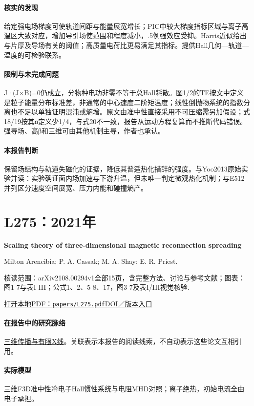 \documentclass[UTF8,a4paper,11pt,openany,fontset=fandol]{ctexbook}
\begin{document}
\paragraph{核实的发现}给定强电场梯度可使轨道间距与能量展宽增长；PIC中较大梯度指标区域与离子高温区大致对应，增加导引场使范围和程度减小，.5例强效应受抑。Harris近似给出与片厚及导场有关的阈值；高质量电荷比更易满足其指标。提供Hall几何—轨道—温度的可检验联系。

\paragraph{限制与未完成问题}J·(J×B)=0仍成立，分物种电功非零不等于总Hall耗散。图1/2的TE按文中定义是粒子能量分布标准差，非通常的中心速度二阶矩温度；线性倒抛物系统的指数分离也不足以单独证明混沌或熵增。原文由准中性直接采用不可压缩需另加假设；式18/19按其α定义少1/4，与式20不一致，报告从运动方程复算而不推断代码错误。强导场、高β和三维可由其他机制主导，作者也承认。

\paragraph{本报告判断}保留场结构与轨道失磁化的证据，降低其普适热化措辞的强度。与Yoo2013原始实验并读：实验确证面内场加速与下游升温，但未唯一判定微观热化机制；与E512并列区分速度空间展宽、压力内能和碰撞熵产。

\section{L275：2021年}\label{paper:L275}

\textbf{Scaling theory of three-dimensional magnetic reconnection spreading}\citep{L275}\

Milton Arencibia;  P. A. Cassak;  M. A. Shay;  E. R. Priest.

\textsf{核读范围：}arXiv2108.00294v1全部15页，含完整方法、讨论与参考文献；\textsf{图表：}图1-7与表I-III；公式1、2、5-8、17，图3-7及表I/III视觉核验.

\href{run:../papers/L275.pdf}{打开本地PDF：\texttt{papers/L275.pdf}}\quad\href{https://doi.org/10.1063/5.0052189}{DOI／版本入口}

\paragraph{在报告中的研究脉络}\hyperref[story:three]{三维传播与有限X线}。关联表示本报告的阅读线索，不自动表示这些论文互相引用。

\paragraph{实际模型}三维F3D准中性冷电子Hall惯性系统与电阻MHD对照；离子绝热，初始电流全由电子承担。
\end{document}
